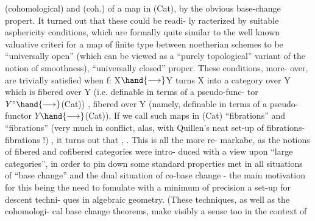 
(cohomological) \hand{\uline{\textcolor{black}{smoothness}}} and (coh.) \hand{\uline{\textcolor{black}{properness}}} of a map in (Cat), by
the obvious base-change propert. It turned out that these could be readi-%
ly racterized by suitable asphericity conditions, which are formally
quite similar to the well known valuative criteri for a map of finite
type between noetherian schemes to be  ``universally open'' (which can
be viewed as a ``purely topological'' variant of the notion of smoothness),
 ``universally closed''   proper\deleted{)}. These conditions, more-%
over, are trivially satisfied when f: X$\hand{\longrightarrow}$Y turns X into a category over Y
which is fibered over Y (i.e. definable in terms of a  pseudo-func-%
tor $Y^{\circ}\hand{\longrightarrow}$(Cat)) ,   fibered over Y (namely, definable in terms of a
 pseudo-functor $Y$\deleted{$^{\circ}$}$\hand{\longrightarrow}$(Cat)). If we call such maps in (Cat)
``fibrations'' and ``fibrations'' (very much in conflict, alas, with 
Quillen's neat set-up of fibrations-fibrations !) , it turns out that
\hand{\uline{\textcolor{black}{fibrations are smooth}}}, \hand{\uline{\textcolor{black}{cofibrations are proper}}}. This is all the more re-%
markabe, as the notions of fibered and cofibered categories were intro-%
duced with a view upon ``large categories'', in order to pin down some
standard properties met in all situations of ``base change'' \hand{(}and  the dual
situation of co-base change \hand{)} - the main motivation for this being the
need to fomulate with a minimum of precision a set-up for descent techni-%
ques in algebraic geometry. (These techniques, as well as the cohomologi-%
cal base change theorems, make visibly a sense too in the context of
